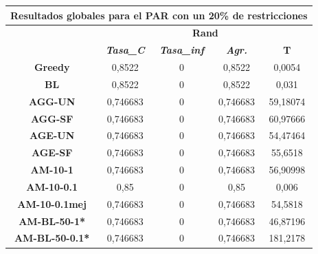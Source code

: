 \documentclass[12pt, spanish]{article}
\begin{document}
\begin{table}[H]
\centering
\begin{tabular}{|c|c|c|c|c|}
\hline
\multicolumn{5}{|c|}{\textbf{Resultados globales para el PAR con un 20\% de restricciones}}                                 \\ \hline
\multirow{2}{*}{}           & \multicolumn{4}{c|}{\textbf{Rand}}                                                            \\ \cline{2-5} 
                            & \textit{\textbf{Tasa\_C}} & \textit{\textbf{Tasa\_inf}} & \textit{\textbf{Agr.}} & \textbf{T} \\ \hline
\textbf{Greedy}             & 0,8522                    & 0                           & 0,8522                 & 0,0054     \\ \hline
\textbf{BL}                 & 0,8522                    & 0                           & 0,8522                 & 0,031      \\ \hline
\textbf{AGG-UN}             & 0,746683                  & 0                           & 0,746683               & 59,18074   \\ \hline
\textbf{AGG-SF}             & 0,746683                  & 0                           & 0,746683               & 60,97666   \\ \hline
\textbf{AGE-UN}             & 0,746683                  & 0                           & 0,746683               & 54,47464   \\ \hline
\textbf{AGE-SF}             & 0,746683                  & 0                           & 0,746683               & 55,6518    \\ \hline
\textbf{AM-10-1}            & 0,746683                  & 0                           & 0,746683               & 56,90998   \\ \hline
\textbf{AM-10-0.1}          & 0,85                      & 0                           & 0,85                   & 0,006      \\ \hline
\textbf{AM-10-0.1mej}       & 0,746683                  & 0                           & 0,746683               & 54,5818    \\ \hline
\textbf{AM-BL-50-1*}        & 0,746683                  & 0                           & 0,746683               & 46,87196   \\ \hline
\textbf{AM-BL-50-0.1*}      & 0,746683                  & 0                           & 0,746683               & 181,2178   \\ \hline

\end{tabular}
\end{table}
\end{document}
